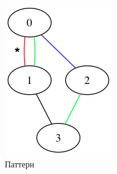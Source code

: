 \begin{figure}[H]
  \includegraphics[max width=\linewidth]{fig/2/patterns/bag.png}
    \caption{Паттерн }
    \label{fig:bag_pattern}
  \endminipage
\end{figure}

